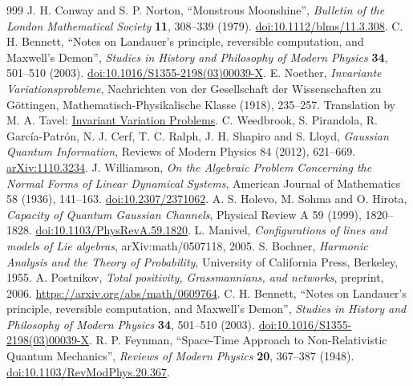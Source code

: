 \begin{thebibliography}{999}
 J. H. Conway and S. P. Norton, ``Monstrous Moonshine'', \emph{Bulletin of the London Mathematical Society} \textbf{11}, 308--339 (1979). \href{https://doi.org/10.1112/blms/11.3.308}{doi:10.1112/blms/11.3.308}.
 C. H. Bennett, ``Notes on Landauer's principle, reversible computation, and Maxwell's Demon'', \emph{Studies in History and Philosophy of Modern Physics} \textbf{34}, 501--510 (2003). \href{https://doi.org/10.1016/S1355-2198(03)00039-X}{doi:10.1016/S1355-2198(03)00039-X}.
E. Noether, \emph{Invariante Variationsprobleme}, Nachrichten von der Gesellschaft der Wissenschaften zu Göttingen, Mathematisch-Physikalische Klasse (1918), 235--257. Translation by M. A. Tavel: \href{https://arxiv.org/abs/physics/0503066}{Invariant Variation Problems}.
C. Weedbrook, S. Pirandola, R. García-Patrón, N. J. Cerf, T. C. Ralph, J. H. Shapiro and S. Lloyd, \emph{Gaussian Quantum Information}, Reviews of Modern Physics 84 (2012), 621--669. \href{https://arxiv.org/abs/1110.3234}{arXiv:1110.3234}.
J. Williamson, \emph{On the Algebraic Problem Concerning the Normal Forms of Linear Dynamical Systems}, American Journal of Mathematics 58 (1936), 141--163. \href{https://doi.org/10.2307/2371062}{doi:10.2307/2371062}.
A. S. Holevo, M. Sohma and O. Hirota, \emph{Capacity of Quantum Gaussian Channels}, Physical Review A 59 (1999), 1820--1828. \href{https://doi.org/10.1103/PhysRevA.59.1820}{doi:10.1103/PhysRevA.59.1820}.
 L. Manivel, \emph{Configurations of lines and models of Lie algebras}, arXiv:math/0507118, 2005.
 S. Bochner, \emph{Harmonic Analysis and the Theory of Probability}, University of California Press, Berkeley, 1955.
A. Postnikov, \emph{Total positivity, Grassmannians, and networks},
preprint, 2006. \url{https://arxiv.org/abs/math/0609764}.
 C. H. Bennett, ``Notes on Landauer's principle,
reversible computation, and Maxwell's Demon'', \emph{Studies in History
and Philosophy of Modern Physics} \textbf{34}, 501--510 (2003).
\href{https://doi.org/10.1016/S1355-2198(03)00039-X}{doi:10.1016/S1355-2198(03)00039-X}.
 R. P. Feynman, ``Space-Time Approach to Non-Relativistic Quantum Mechanics'', \emph{Reviews of Modern Physics} \textbf{20}, 367--387 (1948). \href{https://doi.org/10.1103/RevModPhys.20.367}{doi:10.1103/RevModPhys.20.367}.

\end{thebibliography}
